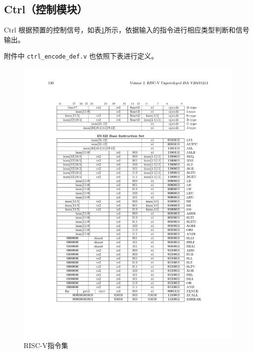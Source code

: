 \documentclass[UTF8,a4paper,autofakebold,15pt]{ctexart}
\begin{document}
\subsection{Ctrl（控制模块）}

	Ctrl 根据预置的控制信号，如表\ref{fig:label3}所示，依据输入的指令进行相应类型判断和信号输出。
	
	附件中 {\tt ctrl\_encode\_def.v} 也依照下表进行定义。
	
	\begin{figure}[hp]
		\centering
		\includegraphics{riscv.pdf}
		\caption{RISC-V指令集}
		\label{fig:label3}
	\end{figure}

\newpage
	   
\end{document}
